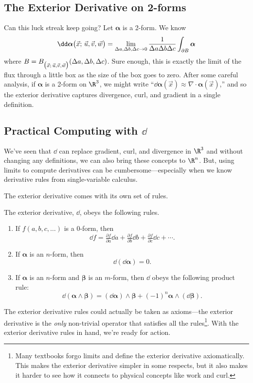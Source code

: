 \subsection{The Exterior Derivative on 2-forms}
Can this luck streak keep going?  Let $\bm\alpha$ is a 2-form.  We know
\[
	\dd \bm\alpha\formarg{\vec x}{\vec u,\vec v,\vec w}
	= \lim_{\Delta a,\Delta b,\Delta c\to 0} \frac{1}{\Delta a\Delta b\Delta c} \int_{\partial B} \bm\alpha
\]
where $B=B_{\big(\vec x;\, \vec u,\vec v,\vec w\big)}(\Delta a,\Delta b,\Delta c)$.
Sure enough, this is exactly the limit of the flux through a little box as the size of the
box goes to zero.  After some careful analysis, if $\bm\alpha$ is a 2-form on $\R^3$,
we might write ``$\dd \bm\alpha(\vec x) \approx \nabla \cdot \bm\alpha(\vec x)$,''
and so the exterior derivative captures divergence, curl, and gradient in a single
definition.

\subsection{Practical Computing with $\dd$}

We've seen that $\dd$ can replace gradient, curl, and divergence in $\R^3$
and without changing any definitions, we can also bring these concepts to $\R^n$.
But, using limits to compute derivatives can be cumbersome---especially when
we know derivative rules from single-variable calculus.

The exterior derivative comes with its own set of rules.

\begin{definition}
	The exterior derivative, $\dd$, obeys the following rules.
	\begin{enumerate}
		\item If $f(a,b,c,\ldots)$ is a 0-form, then
		\[
			\dd f = \tfrac{\partial f}{\partial a} \dd a+
			\tfrac{\partial f}{\partial b} \dd b + 
			\tfrac{\partial f}{\partial c} \dd c + \cdots.
		\]
		\item If $\bm\alpha$ is an $n$-form, then
		\[
			\dd(\dd \bm\alpha) = 0.
		\]
		\item If $\bm\alpha$ is an $n$-form and $\bm\beta$
		is an $m$-form, then $\dd$ obeys the following product
		rule:
		\[
			\dd(\bm\alpha\wedge \bm\beta)= 
			(\dd \bm\alpha)\wedge \bm\beta + (-1)^n \bm\alpha\wedge (\dd \bm\beta).
		\]
	\end{enumerate}
\end{definition}

The exterior derivative rules could actually be taken as axioms---the exterior
derivative is the \emph{only} non-trivial operator that satisfies all
the rules\footnote{
Many textbooks forgo limits and define the exterior derivative axiomatically.
This makes the exterior derivative simpler in some respects, but it also
makes it harder to see how it connects to physical concepts like work
and curl.}.  With the exterior derivative rules in hand, we're ready for action.

